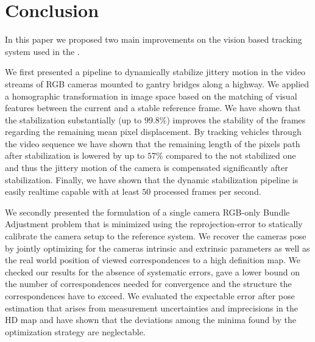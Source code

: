 
\section{Conclusion}

In this paper we proposed two main improvements on the vision based tracking system used in the \Providentia{}.

We first presented a pipeline to dynamically stabilize jittery motion in the video streams of RGB cameras mounted to gantry bridges along a highway.
We applied a homographic transformation in image space based on the matching of visual features between the current and a stable reference frame.
We have shown that the stabilization substantially (up to $99.8\%$) improves the stability of the frames regarding the remaining mean pixel displacement.
By tracking vehicles through the video sequence we have shown that the remaining length of the pixels path after stabilization is lowered by up to $57\%$ compared to the not stabilized one and thus the jittery motion of the camera is compensated significantly after stabilization.
Finally, we have shown that the dynamic stabilization pipeline is easily realtime capable with at least $50$ processed frames per second.

We secondly presented the formulation of a single camera RGB-only Bundle Adjustment problem that is minimized using the reprojection-error to statically calibrate the camera setup to the reference system.
We recover the cameras pose by jointly optimizing for the cameras intrinsic and extrinsic parameters as well as the real world position of viewed correspondences to a high definition map.
We checked our results for the absence of systematic errors, gave a lower bound on the number of correspondences needed for convergence and the structure the correspondences have to exceed.
We evaluated the expectable error after pose estimation that arises from measurement uncertainties and imprecisions in the HD map and have shown that the deviations among the minima found by the optimization strategy are neglectable.
